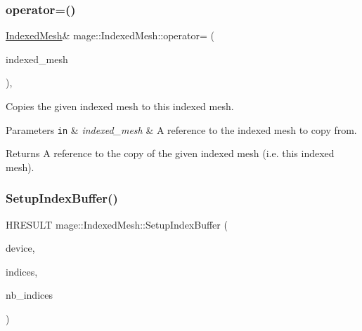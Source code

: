 \hypertarget{classmage_1_1_indexed_mesh_ab15d5ff1ddd76fda2654f87ef611e1f6}{}\label{classmage_1_1_indexed_mesh_ab15d5ff1ddd76fda2654f87ef611e1f6} 
\subsubsection{\texorpdfstring{operator=()}{operator=()}}
{\footnotesize\ttfamily \hyperlink{classmage_1_1_indexed_mesh}{Indexed\+Mesh}\& mage\+::\+Indexed\+Mesh\+::operator= (\begin{DoxyParamCaption}\item[{const \hyperlink{classmage_1_1_indexed_mesh}{Indexed\+Mesh} \&}]{indexed\+\_\+mesh }\end{DoxyParamCaption})\hspace{0.3cm}{\ttfamily [private]}, {\ttfamily [delete]}}

Copies the given indexed mesh to this indexed mesh.


\begin{DoxyParams}[1]{Parameters}
\mbox{\tt in}  & {\em indexed\+\_\+mesh} & A reference to the indexed mesh to copy from. \\
\hline
\end{DoxyParams}
\begin{DoxyReturn}{Returns}
A reference to the copy of the given indexed mesh (i.\+e. this indexed mesh). 
\end{DoxyReturn}
\hypertarget{classmage_1_1_indexed_mesh_abf1d1c81af08168b548ef638e66e8796}{}\label{classmage_1_1_indexed_mesh_abf1d1c81af08168b548ef638e66e8796} 
\subsubsection{\texorpdfstring{Setup\+Index\+Buffer()}{SetupIndexBuffer()}}
{\footnotesize\ttfamily H\+R\+E\+S\+U\+LT mage\+::\+Indexed\+Mesh\+::\+Setup\+Index\+Buffer (\begin{DoxyParamCaption}\item[{\hyperlink{namespacemage_ae74f374780900893caa5555d1031fd79}{Com\+Ptr}$<$ I\+D3\+D11\+Device2 $>$}]{device,  }\item[{const uint32\+\_\+t $\ast$}]{indices,  }\item[{size\+\_\+t}]{nb\+\_\+indices }\end{DoxyParamCaption})\hspace{0.3cm}{\ttfamily [protected]}}


